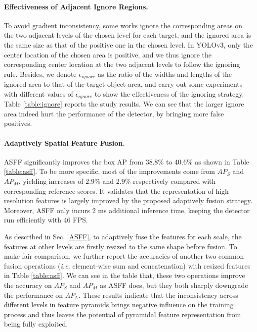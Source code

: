 \documentclass[10pt,twocolumn,letterpaper]{article}
\begin{document}
\paragraph{Effectiveness of Adjacent Ignore Regions.} To avoid gradient inconsistency, some works \cite{guide,FSAF} ignore the corresponding areas on the two adjacent levels of the chosen level for each target, and the ignored area is the same size as that of the positive one in the chosen level. In YOLOv3, only the center location of the chosen area is positive, and we thus ignore the corresponding center location at the two adjacent levels to follow the ignoring rule. Besides, we denote $\epsilon_{ignore}$ as the ratio of the widths and lengths of the ignored area to that of the target object area, and carry out some experiments with different values of $\epsilon_{ignore}$ to show the effectiveness of the ignoring strategy. Table \ref{table:ignore} reports the study results. We can see that the larger ignore area indeed hurt the performance of the detector, by bringing more false positives.    

\paragraph{Adaptively Spatial Feature Fusion.} ASFF significantly improves the box AP from 38.8\% to 40.6\% as shown in Table \ref{table:asff}. To be more specific, most of the improvements come from $AP_S$ and $AP_M$, yielding increases of 2.9\% and 2.9\% respectively compared with corresponding reference scores. It validates that the representation of high-resolution features is largely improved by the proposed adaptively fusion strategy. Moreover, ASFF only incurs 2 ms additional inference time, keeping the detector run efficiently with 46 FPS.

As described in Sec. \ref{ASFF}, to adaptively fuse the features for each scale, the features at other levels are firstly resized to the same shape before fusion. To make fair comparison, we further report the accuracies of another two common fusion operations (\emph{i.e.} element-wise sum and concatenation) with resized features in Table \ref{table:asff}. We can see in the table that, these two operations improve the accuracy on $AP_S$ and $AP_M$ as ASFF does, but they both sharply downgrade the performance on $AP_L$. These results indicate that the inconsistency across different levels in feature pyramids brings negative influence on the training process and thus leaves the potential of pyramidal feature representation from being fully exploited.
\end{document}
